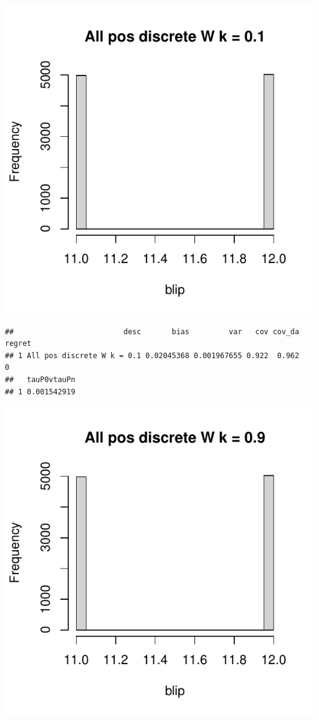 \documentclass[11pt]{article}\usepackage[]{graphicx}\usepackage[table]{xcolor}
\makeatletter
\def\maxwidth{ %
  \ifdim\Gin@nat@width>\linewidth
    \linewidth
  \else
    \Gin@nat@width
  \fi
}
\newenvironment{kframe}{%
 \def\at@end@of@kframe{}%
 \ifinner\ifhmode%
  \def\at@end@of@kframe{\end{minipage}}%
  \begin{minipage}{\columnwidth}%
 \fi\fi%
 \def\FrameCommand##1{\hskip\@totalleftmargin \hskip-\fboxsep
 \colorbox{shadecolor}{##1}\hskip-\fboxsep
     \hskip-\linewidth \hskip-\@totalleftmargin \hskip\columnwidth}%
 \MakeFramed {\advance\hsize-\width
   \@totalleftmargin\z@ \linewidth\hsize
   \@setminipage}}%
 {\par\unskip\endMakeFramed%
 \at@end@of@kframe}
\newenvironment{knitrout}{}{} %
\makeatother
\begin{document}










\begin{knitrout}
\color{fgcolor}
\includegraphics[width=\maxwidth]{figure/unnamed-chunk-4-1} 
\begin{kframe}\begin{verbatim}
##                         desc       bias         var   cov cov_da regret
## 1 All pos discrete W k = 0.1 0.02045368 0.001967655 0.922  0.962      0
##   tauP0vtauPn
## 1 0.001542919
\end{verbatim}
\end{kframe}
\includegraphics[width=\maxwidth]{figure/unnamed-chunk-4-2} 

\end{knitrout}
\end{document}
